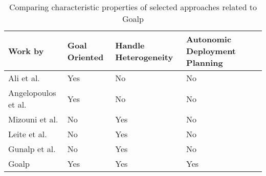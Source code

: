 \begin{table*}[t]
\centering
\caption{Comparing characteristic properties of selected approaches related to Goalp}
\label{table_related_works}
\begin{tabular}{|p{4cm}|p{1.75cm}|p{1.75cm}|p{1.75cm}|p{1.75cm}|}
\hline
Work by &
   Goal  \newline Oriented &
    Handle  \newline Heterogeneity &
    Autonomic  \newline  Deployment \newline Planning \\ \hline

Ali et al.\citep{ali_requirements-driven_2014} & Yes & No & No \\ \hline
Angelopoulos et al. \cite{angelopoulos_capturing_2015} & Yes & No & No \\ \hline
Mizouni et al. \citep{mizouni_framework_2014} & No & Yes & No \\ \hline
Leite et al. \citep{ferreira_leite_user_2014}  & No & Yes & No \\ \hline
Gunalp et al.\citep{gunalp_rondo_2015} & No & Yes  &  No\\ \hline
Goalp & Yes & Yes & Yes \\ \hline
\end{tabular}
\end{table*}


